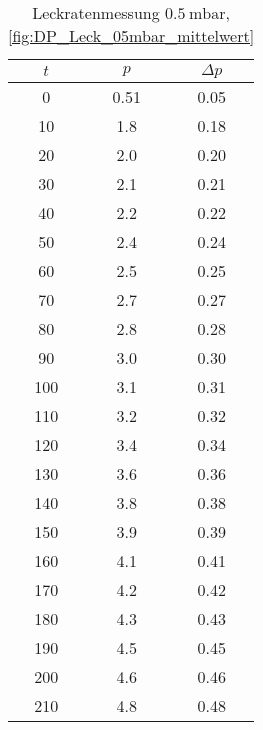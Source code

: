 \begin{table}[H]
    \centering
    \caption{Leckratenmessung $\SI{0.5}{\milli\bar}$, \ref{fig:DP_Leck_05mbar_mittelwert}}
    \label{tab:}
    \begin{tabular}{c c c}
        \toprule
        {$t$} & {$p$} & {$\Delta p$} \\
        \midrule
        0 & 0.51 & 0.05\\
        10 & 1.8 & 0.18\\
        20 & 2.0 & 0.20\\
        30 & 2.1 & 0.21\\
        40 & 2.2 & 0.22\\
        50 & 2.4 & 0.24\\
        60 & 2.5 & 0.25\\
        70 & 2.7 & 0.27\\
        80 & 2.8 & 0.28\\
        90 & 3.0 & 0.30\\
        100 & 3.1 & 0.31\\
        110 & 3.2 & 0.32\\
        120 & 3.4 & 0.34\\
        130 & 3.6 & 0.36\\
        140 & 3.8 & 0.38\\
        150 & 3.9 & 0.39\\
        160 & 4.1 & 0.41\\
        170 & 4.2 & 0.42\\
        180 & 4.3 & 0.43\\
        190 & 4.5 & 0.45\\
        200 & 4.6 & 0.46\\
        210 & 4.8 & 0.48\\
        \bottomrule
    \end{tabular}
\end{table}

